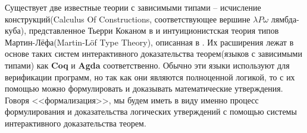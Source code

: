 Существует две известные теории с зависимыми типами -- исчисление конструкций(Calculus Of Constructions, соответствующее вершине $\lambda{}P{}\omega$ лямбда-куба), представленное Тьерри Коканом в \cite{coquand1988calculus} и интуиционистская теория типов Мартин-Лёфа(Martin-L{\"o}f Type Theory), описанная в \cite{martin1975intuitionistic}. Их расширения лежат в основе таких систем интерактивного доказательства теорем(языков с зависимыми типами) как \textbf{Coq} и \textbf{Agda} соответственно. Обычно эти языки используют для верификации программ, но так как они являются полноценной логикой, то с их помощью можно формулировать и доказывать математические утверждения. Говоря <<формализация>>, мы будем иметь в виду именно процесс формулирования и доказательства логических утверждений с помощью системы интерактивного доказательства теорем.
